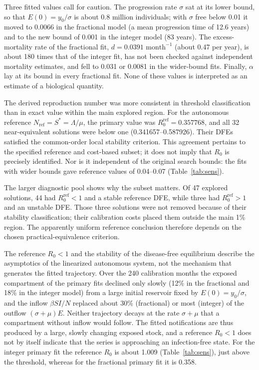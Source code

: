 \documentclass[pdflatex,sn-mathphys-ay]{sn-jnl}
\begin{document}
Three fitted values call for caution. The progression rate $\sigma$ sat at its lower bound, so that $E(0)=y_0/\sigma$ is about 0.8 million individuals; with $\sigma$ free below 0.01 it moved to 0.0066 in the fractional model (a mean progression time of 12.6 years) and to the new bound of 0.001 in the integer model (83 years). The excess-mortality rate of the fractional fit, $d=0.0391\text{ month}^{-1}$ (about 0.47 per year), is about 180 times that of the integer fit, has not been checked against independent mortality estimates, and fell to 0.031 or 0.0081 in the wider-bound fits. Finally, $\alpha$ lay at its bound in every fractional fit. None of these values is interpreted as an estimate of a biological quantity.

The derived reproduction number was more consistent in threshold classification than in exact value within the main explored region. For the autonomous reference $N_{\mathrm{ref}}=S^*=\Lambda/\mu$, the primary value was $R_0^{\mathrm{ref}}=0.357768$, and all 32 near-equivalent solutions were below one (0.341657--0.587926). Their DFEs satisfied the common-order local stability criterion. This agreement pertains to the specified reference and cost-based subset; it does not imply that $R_0$ is precisely identified. Nor is it independent of the original search bounds: the fits with wider bounds gave reference values of 0.04--0.07 (Table~\ref{tab:sens}).

The larger diagnostic pool shows why the subset matters. Of 47 explored solutions, 44 had $R_0^{\mathrm{ref}}<1$ and a stable reference DFE, while three had $R_0^{\mathrm{ref}}>1$ and an unstable DFE. Those three solutions were not removed because of their stability classification; their calibration costs placed them outside the main 1\% region. The apparently uniform reference conclusion therefore depends on the chosen practical-equivalence criterion.

The reference $R_0<1$ and the stability of the disease-free equilibrium describe the asymptotics of the linearized autonomous system, not the mechanism that generates the fitted trajectory. Over the 240 calibration months the exposed compartment of the primary fits declined only slowly (12\% in the fractional and 18\% in the integer model) from a large initial reservoir fixed by $E(0)=y_0/\sigma$, and the inflow $\beta SI/N$ replaced about 30\% (fractional) or most (integer) of the outflow $(\sigma+\mu)E$. Neither trajectory decays at the rate $\sigma+\mu$ that a compartment without inflow would follow. The fitted notifications are thus produced by a large, slowly changing exposed stock, and a reference $R_0<1$ does not by itself indicate that the series is approaching an infection-free state. For the integer primary fit the reference $R_0$ is about 1.009 (Table~\ref{tab:sens}), just above the threshold, whereas for the fractional primary fit it is 0.358.
\end{document}
